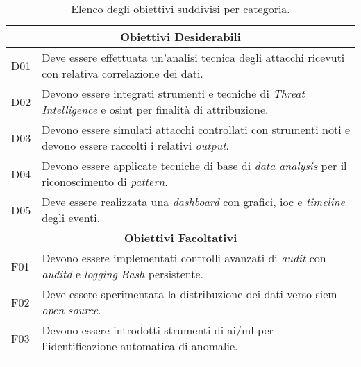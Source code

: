 \begin{center}
\begin{longtable}{|p{}|p{}|}
\multicolumn{2}{|c|}{\textbf{Obiettivi Desiderabili}} \\ \hline
D01 & Deve essere effettuata un’analisi tecnica degli attacchi ricevuti con relativa correlazione dei dati. \\ \hline
D02 & Devono essere integrati strumenti e tecniche di \textit{Threat Intelligence} e \gls{osint} per finalità di attribuzione. \\ \hline
D03 & Devono essere simulati attacchi controllati con strumenti noti e devono essere raccolti i relativi \textit{output}. \\ \hline
D04 & Devono essere applicate tecniche di base di \textit{data analysis} per il riconoscimento di \textit{pattern}. \\ \hline
D05 & Deve essere realizzata una \textit{dashboard} con grafici, \gls{ioc} e \textit{timeline} degli eventi. \\ \hline

\multicolumn{2}{|c|}{\textbf{Obiettivi Facoltativi}} \\ \hline
F01 & Devono essere implementati controlli avanzati di \textit{audit} con \textit{auditd} e \textit{logging} \textit{Bash} persistente. \\ \hline
F02 & Deve essere sperimentata la distribuzione dei dati verso \gls{siem} \textit{open source}. \\ \hline
F03 & Devono essere introdotti strumenti di \gls{ai}/\gls{ml} per l’identificazione automatica di anomalie. \\ \hline

\caption{Elenco degli obiettivi suddivisi per categoria.}
\label{tab:obiettivi}
\end{longtable}
\end{center}
